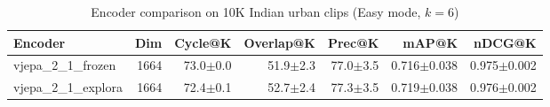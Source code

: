 \begin{table}[ht]
\centering
\caption{Encoder comparison on 10K Indian urban clips (Easy mode, $k=6$)}
\label{tab:encoder_comparison}
\begin{tabular}{lrrrrrr}
\toprule
Encoder & Dim & Cycle@K & Overlap@K & Prec@K & mAP@K & nDCG@K \\
\midrule
vjepa\_2\_1\_frozen & 1664 & 73.0{\tiny$\pm$0.0} & 51.9{\tiny$\pm$2.3} & 77.0{\tiny$\pm$3.5} & 0.716{\tiny$\pm$0.038} & 0.975{\tiny$\pm$0.002} \\
vjepa\_2\_1\_explora & 1664 & 72.4{\tiny$\pm$0.1} & 52.7{\tiny$\pm$2.4} & 77.3{\tiny$\pm$3.5} & 0.719{\tiny$\pm$0.038} & 0.976{\tiny$\pm$0.002} \\
\bottomrule
\end{tabular}
\end{table}